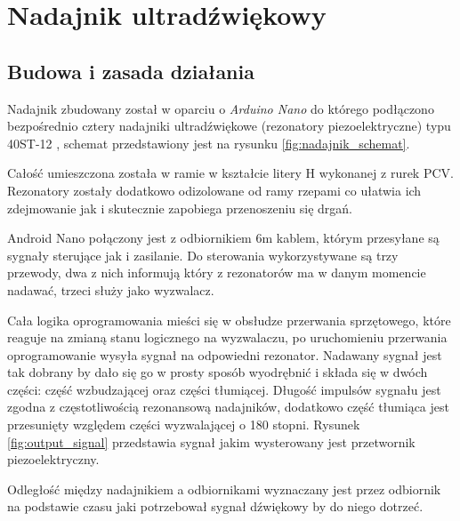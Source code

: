 \chapter{Nadajnik ultradźwiękowy}
\section{Budowa i zasada działania}

Nadajnik zbudowany został w oparciu o \textit{Arduino Nano} \cite{bib:arduinoNano} do którego podłączono 
bezpośrednio cztery nadajniki ultradźwiękowe (rezonatory piezoelektryczne) typu 40ST-12 \cite{bib:40ST12}, schemat 
przedstawiony jest na rysunku \ref{fig:nadajnik_schemat}.



Całość umieszczona została w ramie w kształcie litery H wykonanej z rurek PCV.
Rezonatory zostały dodatkowo odizolowane od ramy rzepami co ułatwia ich zdejmowanie jak i skutecznie
zapobiega przenoszeniu się drgań.



Android Nano połączony jest z odbiornikiem 6m kablem, którym przesyłane są sygnały sterujące jak i zasilanie.
Do sterowania wykorzystywane są trzy przewody, dwa z nich informują który z rezonatorów ma w danym momencie nadawać,
trzeci służy jako wyzwalacz. 

Cała logika oprogramowania mieści się w obsłudze przerwania sprzętowego, które reaguje na zmianą stanu logicznego
na wyzwalaczu,
po uruchomieniu przerwania oprogramowanie wysyła sygnał na odpowiedni rezonator. 
Nadawany sygnał jest tak dobrany by dało się go w prosty sposób wyodrębnić i składa się w dwóch
części: część wzbudzającej oraz części tłumiącej.
Długość impulsów sygnału jest zgodna z częstotliwością rezonansową nadajników, dodatkowo część tłumiąca
jest przesunięty względem części wyzwalającej o 180 stopni.  
Rysunek \ref{fig:output_signal} przedstawia sygnał jakim wysterowany jest przetwornik piezoelektryczny. 

Odległość między nadajnikiem a odbiornikami wyznaczany jest przez odbiornik na podstawie
czasu jaki potrzebował sygnał dźwiękowy by do niego dotrzeć.

